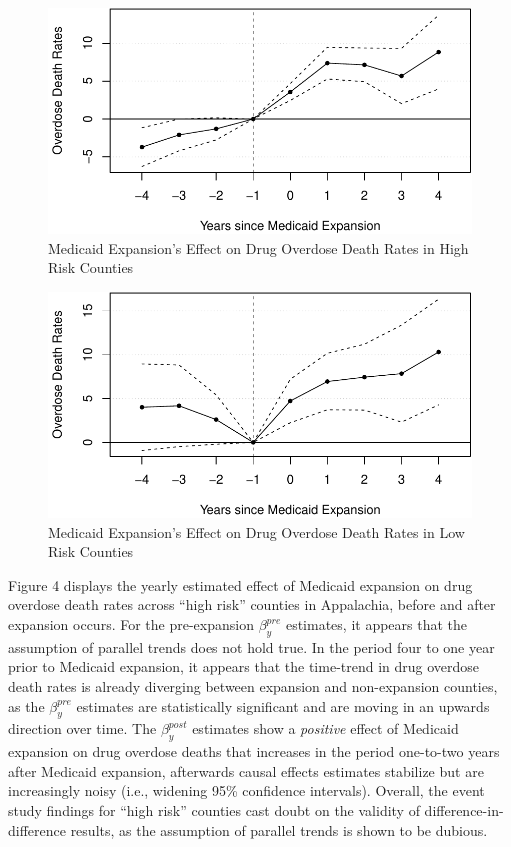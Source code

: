 \documentclass[
  11pt,
]{article}
\begin{document}
\begin{figure}
\centering
\includegraphics{figs/fig4.pdf}
\caption{Medicaid Expansion's Effect on Drug Overdose Death Rates in
High Risk Counties}
\end{figure}

\begin{figure}
\centering
\includegraphics{figs/fig5.pdf}
\caption{Medicaid Expansion's Effect on Drug Overdose Death Rates in Low
Risk Counties}
\end{figure}

Figure 4 displays the yearly estimated effect of Medicaid expansion on
drug overdose death rates across ``high risk'' counties in Appalachia,
before and after expansion occurs. For the pre-expansion
\(\beta^{pre}_y\) estimates, it appears that the assumption of parallel
trends does not hold true. In the period four to one year prior to
Medicaid expansion, it appears that the time-trend in drug overdose
death rates is already diverging between expansion and non-expansion
counties, as the \(\beta^{pre}_y\) estimates are statistically
significant and are moving in an upwards direction over time. The
\(\beta^{post}_y\) estimates show a \emph{positive} effect of Medicaid
expansion on drug overdose deaths that increases in the period
one-to-two years after Medicaid expansion, afterwards causal effects
estimates stabilize but are increasingly noisy (i.e., widening 95\%
confidence intervals). Overall, the event study findings for ``high
risk'' counties cast doubt on the validity of difference-in-difference
results, as the assumption of parallel trends is shown to be dubious.
\end{document}
